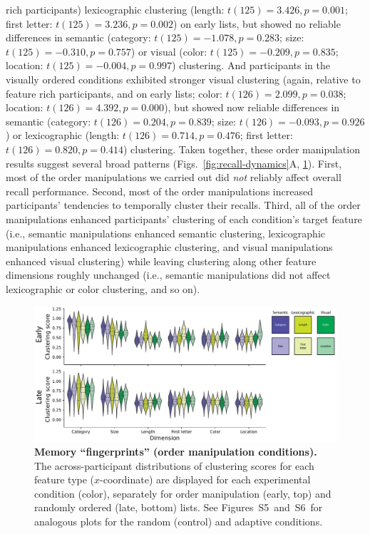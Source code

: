 \documentclass[11pt]{article}
\newcommand{\fingerprintsRandom}{S5}
\newcommand{\fingerprintsAdaptive}{S6}
\begin{document}
rich participants) lexicographic clustering (length: $t(125) = 3.426, p =
0.001$; first letter: $t(125) = 3.236, p = 0.002$) on early lists, but showed
no reliable differences in semantic (category: $t(125) = -1.078, p = 0.283$;
size: $t(125) = -0.310, p = 0.757$) or visual (color: $t(125) = -0.209, p =
0.835$; location: $t(125) = -0.004, p = 0.997$) clustering. And participants in
the visually ordered conditions exhibited stronger visual clustering (again,
relative to feature rich participants, and on early lists; color: $t(126) =
2.099, p = 0.038$; location: $t(126) = 4.392, p = 0.000$), but showed now
reliable differences in semantic (category: $t(126) = 0.204, p = 0.839$; size:
$t(126) = -0.093, p = 0.926$) or lexicographic (length: $t(126) = 0.714, p =
0.476$; first letter: $t(126) = 0.820, p = 0.414$) clustering. Taken together,
these order manipulation results suggest several broad patterns
(Figs.~\ref{fig:recall-dynamics}A, \ref{fig:fingerprints}). First, most of the
order manipulations we carried out did \textit{not} reliably affect overall
recall performance. Second, most of the order manipulations increased
participants' tendencies to temporally cluster their recalls. Third, all of the
order manipulations enhanced participants' clustering of each condition's
target feature (i.e., semantic manipulations enhanced semantic clustering,
lexicographic manipulations enhanced lexicographic clustering, and visual
manipulations enhanced visual clustering) while leaving clustering along other
feature dimensions roughly unchanged (i.e., semantic manipulations did not
affect lexicographic or color clustering, and so on).

\begin{figure}[tp] \centering
    \includegraphics[width=\textwidth]{figures/fingerprints}
    
\caption{\textbf{Memory ``fingerprints'' (order manipulation conditions).} The
across-participant distributions of clustering scores for each feature type
($x$-coordinate) are displayed for each experimental condition (color),
separately for order manipulation (early, top) and randomly ordered (late,
bottom) lists. See Figures~\fingerprintsRandom~and~\fingerprintsAdaptive~for
analogous plots for the random (control) and adaptive conditions.}
\label{fig:fingerprints}

\end{figure}
\end{document}

